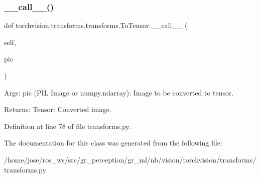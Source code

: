 \subsubsection{\texorpdfstring{\+\_\+\+\_\+call\+\_\+\+\_\+()}{\_\_call\_\_()}}
{\footnotesize\ttfamily def torchvision.\+transforms.\+transforms.\+To\+Tensor.\+\_\+\+\_\+call\+\_\+\+\_\+ (\begin{DoxyParamCaption}\item[{}]{self,  }\item[{}]{pic }\end{DoxyParamCaption})}

\begin{DoxyVerb}Args:
    pic (PIL Image or numpy.ndarray): Image to be converted to tensor.

Returns:
    Tensor: Converted image.
\end{DoxyVerb}
 

Definition at line 78 of file transforms.\+py.



The documentation for this class was generated from the following file\+:\begin{DoxyCompactItemize}
\item 
/home/jose/ros\+\_\+ws/src/gr\+\_\+perception/gr\+\_\+ml/nb/vision/torchvision/transforms/transforms.\+py\end{DoxyCompactItemize}
